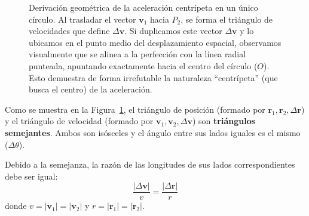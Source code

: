 \documentclass[11pt,a4paper]{book}
\begin{document}
\begin{figure}[htbp]
\caption{Derivación geométrica de la aceleración centrípeta en un único círculo. Al trasladar el vector $\boldsymbol{v}_1$ hacia $P_2$, se forma el triángulo de velocidades que define $\Delta\boldsymbol{v}$. Si duplicamos este vector $\Delta\boldsymbol{v}$ y lo ubicamos en el punto medio del desplazamiento espacial, observamos visualmente que se alinea a la perfección con la línea radial punteada, apuntando exactamente hacia el centro del círculo ($O$). Esto demuestra de forma irrefutable la naturaleza ``centrípeta'' (que busca el centro) de la aceleración.}
\label{fig:aceleracion_centripeta}
\end{figure}

Como se muestra en la Figura~\ref{fig:aceleracion_centripeta}, el triángulo de posición (formado por $\boldsymbol{r}_1, \boldsymbol{r}_2, \Delta\boldsymbol{r}$) y el triángulo de velocidad (formado por $\boldsymbol{v}_1, \boldsymbol{v}_2, \Delta\boldsymbol{v}$) son \textbf{triángulos semejantes}. Ambos son isósceles y el ángulo entre sus lados iguales es el mismo ($\Delta \theta$).

Debido a la semejanza, la razón de las longitudes de sus lados correspondientes debe ser igual:
\[ \frac{|\Delta \boldsymbol{v}|}{v} = \frac{|\Delta \boldsymbol{r}|}{r} \]
donde $v=|\boldsymbol{v}_1|=|\boldsymbol{v}_2|$ y $r=|\boldsymbol{r}_1|=|\boldsymbol{r}_2|$.
\end{document}
